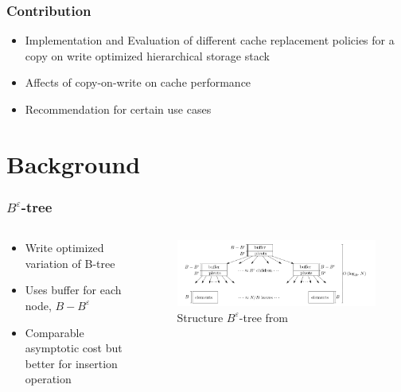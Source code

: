 \documentclass[
	aspectratio=169,
	compress,
]{beamer}
\newcommand{\navframetitle}[1]{\frametitle{#1\hfill{\footnotesize\lastsection{}}}}
\begin{document}
\begin{frame}
	\navframetitle{Contribution}
	
	\begin{itemize}
		\item Implementation and Evaluation of different cache replacement policies for a copy on write optimized 
				hierarchical storage stack
		\item Affects of copy-on-write on cache performance
		\item Recommendation for certain use cases
	\end{itemize}
\end{frame}

\section{Background}
\label{sec:background}

\begin{frame}
	\navframetitle{$B^{\varepsilon}$-tree}

	\begin{columns}
		\begin{column}{0.5\textwidth}
			\begin{itemize}
				\item Write optimized variation of B-tree
				\item Uses buffer for each node, $B - B^{\varepsilon}$
				\item Comparable asymptotic cost but better for insertion operation
			\end{itemize}
		\end{column}
		\begin{column}{0.5\textwidth}
			\begin{figure}[ht]
    			\centering
    			\includegraphics[scale=0.25]{B-epsilon_structure.png}
    			\caption{Structure $B^{\varepsilon}$-tree from \cite{bender2015introduction}}
        		\label{fig:structure B-epsilon-tree}
			\end{figure}			
		\end{column}
	\end{columns}
\end{frame}
\end{document}
